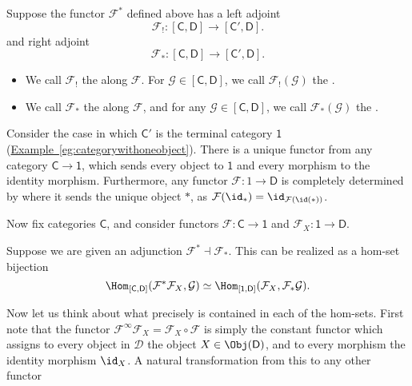 \documentclass[notes.tex]{subfiles}
\begin{document}
\begin{definition}
  \label{def:kan_extension}
  Suppose the functor $\mathcal{F}^{*}$ defined above has a left adjoint
  \begin{equation*}
    \mathcal{F}_{!}\colon [\mathsf{C}, \mathsf{D}] \to [\mathsf{C}', \mathsf{D}].
  \end{equation*}
  and right adjoint
  \begin{equation*}
    \mathcal{F}_{*}\colon [\mathsf{C}, \mathsf{D}] \to [\mathsf{C}', \mathsf{D}].
  \end{equation*}
  \begin{itemize}
    \item We call $\mathcal{F}_{!}$ the  along $\mathcal{F}$. For $\mathcal{\mathcal{G}} \in [\mathsf{C}, \mathsf{D}]$, we call $\mathcal{F}_{!}(\mathcal{G})$ the . 
          
    \item We call $\mathcal{F}_{*}$ the  along $\mathcal{F}$, and for any $\mathcal{G} \in [\mathsf{C}, \mathsf{D}]$, we call $\mathcal{F}_{*}(\mathcal{G})$ the .
  \end{itemize}
\end{definition}

\begin{example}
  Consider the case in which $\mathsf{C}'$ is the terminal category $\mathsf{1}$ (\hyperref[eg:categorywithoneobject]{Example~\ref*{eg:categorywithoneobject}}). There is a unique functor from any category $\mathsf{C} \to \mathsf{1}$, which sends every object to $\mathsf{1}$ and every morphism to the identity morphism. Furthermore, any functor $\mathcal{F}\colon 1 \to \mathsf{D}$ is completely determined by where it sends the unique object $*$, as $\mathcal{F}(\id_{*}) = \id_{\mathcal{F}(\id(*))}$.

  Now fix categories $\mathsf{C}$, and consider functors $\mathcal{F}\colon \mathsf{C} \to \mathsf{1}$ and $\mathcal{F}_{X}\colon \mathsf{1} \to \mathsf{D}$.

  Suppose we are given an adjunction $\mathcal{F}^{*} \dashv \mathcal{F}_{*}$. This can be realized as a hom-set bijection
  \begin{equation*}
    \Hom_{[\mathsf{C}, \mathsf{D}]}(\mathcal{F}^{*}\mathcal{F}_{X}, \mathcal{G}) \simeq \Hom_{[\mathsf{1}, \mathsf{D}]}(\mathcal{F}_{X}, \mathcal{F}_{*}\mathcal{G}).
  \end{equation*}

  Now let us think about what precisely is contained in each of the hom-sets. First note that the functor $\mathcal{F}^{\infty}\mathcal{F}_{X} = \mathcal{F}_{X} \circ \mathcal{F}$ is simply the constant functor which assigns to every object in $\mathcal{D}$ the object $X \in \Obj(\mathsf{D})$, and to every morphism the identity morphism $\id_{X}$. A natural transformation from this to any other functor
\end{example}
\end{document}
